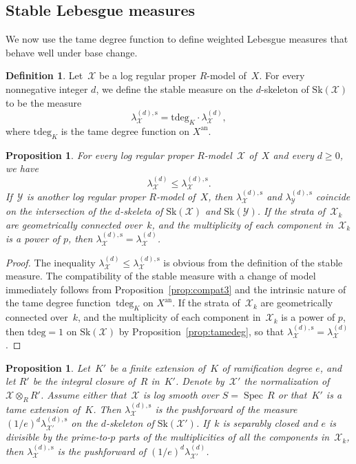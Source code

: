 \documentclass[11pt]{article}
\newtheorem{prop}[equation]{Proposition}
\theoremstyle{definition}
\newtheorem{definition}[equation]{Definition}
\numberwithin{equation}{subsection}
\newcommand{\cX}{\ensuremath{\mathscr{X}}}
\newcommand{\cY}{\ensuremath{\mathscr{Y}}}
\newcommand{\an}{\mathrm{an}}
\newcommand{\Sk}{\mathrm{Sk}}
\newcommand{\rs}{\mathrm{s}}
\newcommand{\tdeg}{\mathrm{tdeg}}
\DeclareMathOperator{\Spec}{Spec}
\let\Leb\lambda
\begin{document}
\subsection{Stable Lebesgue measures}
We now use the tame degree function to define weighted Lebesgue measures that behave well under base change.
\begin{definition}\label{def:stablemeas}
Let~$\cX$ be a log regular proper $R$\nobreakdash-model of~$X$. For every nonnegative integer $d$, we define the
stable measure on the $d$\nobreakdash-skeleton of $\Sk(\cX)$ to be the measure
\[
\Leb_{\cX}^{(d),\rs}=\tdeg_K \cdot \Leb_{\cX}^{(d)},
\]
where $\tdeg_K$ is the tame degree function on $X^{\an}$.
\end{definition}
\begin{prop}\label{prop:stmeasure1}
For every log regular proper $R$\nobreakdash-model~$\cX$ of~$X$ and every $d\geq 0$, we have
\[
\Leb_{\cX}^{(d)} \leq \Leb_{\cX}^{(d),\rs}.
\]
If~$\cY$ is another log regular proper $R$\nobreakdash-model of~$X$, then $\Leb_{\cX}^{(d),\rs}$ and $\Leb_{\cY}^{(d),\rs}$ coincide on the intersection of the $d$\nobreakdash-skeleta of $\Sk(\cX)$ and $\Sk(\cY)$. If the strata of~$\cX_k$ are geometrically connected over~$k$, and the multiplicity of each component in~$\cX_k$ is a power of $p$, then $\Leb_{\cX}^{(d),\rs}=\Leb_{\cX}^{(d)}$.
\end{prop}
\begin{proof}
The inequality $\Leb_{\cX}^{(d)} \leq \Leb_{\cX}^{(d),\rs}$ is obvious from the definition of the stable measure.
The compatibility of the stable measure with a change of model immediately follows from Proposition~\ref{prop:compat3} and the intrinsic nature of the tame degree function~$\tdeg_K$ on $X^{\an}$. If the strata of~$\cX_k$ are geometrically connected over~$k$, and the multiplicity of each component in~$\cX_k$ is a power of $p$, then $\tdeg=1$ on $\Sk(\cX)$ by Proposition~\ref{prop:tamedeg}, so that $\Leb_{\cX}^{(d),\rs}=\Leb_{\cX}^{(d)}$.
\end{proof}
\begin{prop}\label{prop:stmeasure2}
Let~$K'$ be a finite extension of~$K$ of ramification degree $e$, and let $R'$ be the integral closure of~$R$ in~$K'$. Denote by~$\cX'$ the normalization of $\cX\otimes_R R'$.
Assume either that~$\cX$ is log smooth over $S=\Spec\,R$ or that~$K'$ is a tame extension of~$K$. Then $\Leb^{(d),\rs}_{\cX}$ is the pushforward of the measure $(1/e)^d\Leb^{(d),\rs}_{\cX'}$ on the $d$\nobreakdash-skeleton of $\Sk(\cX')$. If~$k$ is separably closed and $e$ is divisible by the prime-to-$p$ parts of the multiplicities of all the components in~$\cX_k$, then $\Leb^{(d),\rs}_{\cX}$ is the pushforward of $(1/e)^d\Leb^{(d)}_{\cX'}$.
\end{prop}
\end{document}
